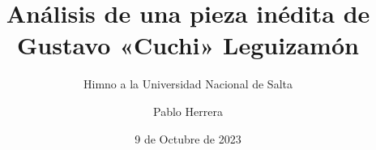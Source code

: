 \documentclass[a5paper,10pt,parskip=half,]{scrbook}
\begin{document}
\title{Análisis de una pieza inédita de\\Gustavo «Cuchi» Leguizamón}
\subtitle{Himno a la Universidad Nacional de Salta}
\author{Pablo Herrera}
\date{9 de Octubre de 2023}
\maketitle

\frontmatter
\newpage{\ }

{\footnotesize \tableofcontents}


\mainmatter





\backmatter
\begin{appendices}


\end{appendices}
\listoftables
\listoffigures
\end{document}
